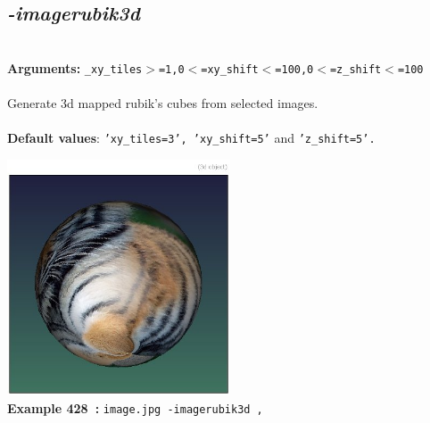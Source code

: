 \documentclass[a4paper,11pt,twoside]{book}
\begin{document}
\subsection{\emph{-imagerubik3d} }\vspace*{-0.5em}
~\\\textbf{Arguments: } 
{\small \texttt{\_xy\_tiles$>$=1,0$<$=xy\_shift$<$=100,0$<$=z\_shift$<$=100}}\\~\\
Generate 3d mapped rubik's cubes from selected images.
~\\~\\\textbf{Default values}: {\small \texttt{'xy\_tiles=3', 'xy\_shift=5'} and \texttt{'z\_shift=5'.}}
\begin{center}\includegraphics[keepaspectratio=true,height=7cm,width=\textwidth]{img/gmic_def428.jpg}\\
{\footnotesize \textbf{Example 428~:} \texttt{image.jpg -imagerubik3d ,}}
\end{center}
\end{document}

